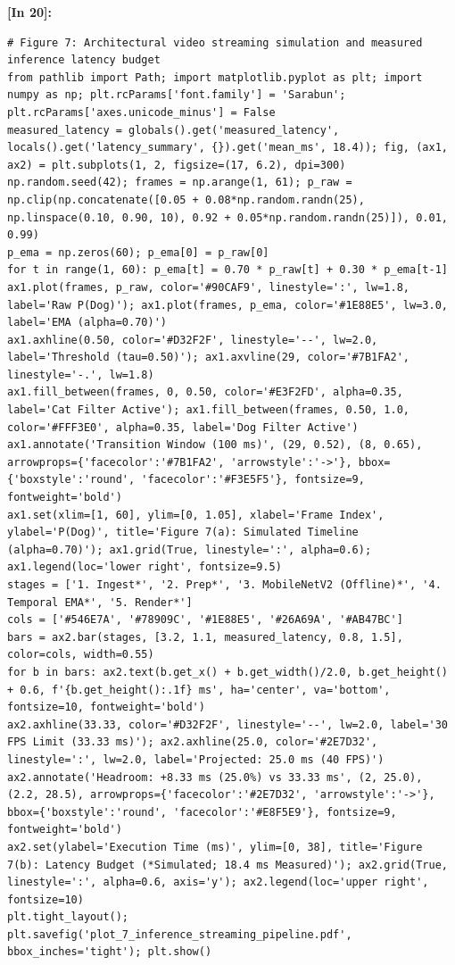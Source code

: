 \vspace{0.6em}
\noindent\textbf{\small [In 20]:}
\begin{lstlisting}[style=pycode]
# Figure 7: Architectural video streaming simulation and measured inference latency budget
from pathlib import Path; import matplotlib.pyplot as plt; import numpy as np; plt.rcParams['font.family'] = 'Sarabun'; plt.rcParams['axes.unicode_minus'] = False
measured_latency = globals().get('measured_latency', locals().get('latency_summary', {}).get('mean_ms', 18.4)); fig, (ax1, ax2) = plt.subplots(1, 2, figsize=(17, 6.2), dpi=300)
np.random.seed(42); frames = np.arange(1, 61); p_raw = np.clip(np.concatenate([0.05 + 0.08*np.random.randn(25), np.linspace(0.10, 0.90, 10), 0.92 + 0.05*np.random.randn(25)]), 0.01, 0.99)
p_ema = np.zeros(60); p_ema[0] = p_raw[0]
for t in range(1, 60): p_ema[t] = 0.70 * p_raw[t] + 0.30 * p_ema[t-1]
ax1.plot(frames, p_raw, color='#90CAF9', linestyle=':', lw=1.8, label='Raw P(Dog)'); ax1.plot(frames, p_ema, color='#1E88E5', lw=3.0, label='EMA (alpha=0.70)')
ax1.axhline(0.50, color='#D32F2F', linestyle='--', lw=2.0, label='Threshold (tau=0.50)'); ax1.axvline(29, color='#7B1FA2', linestyle='-.', lw=1.8)
ax1.fill_between(frames, 0, 0.50, color='#E3F2FD', alpha=0.35, label='Cat Filter Active'); ax1.fill_between(frames, 0.50, 1.0, color='#FFF3E0', alpha=0.35, label='Dog Filter Active')
ax1.annotate('Transition Window (100 ms)', (29, 0.52), (8, 0.65), arrowprops={'facecolor':'#7B1FA2', 'arrowstyle':'->'}, bbox={'boxstyle':'round', 'facecolor':'#F3E5F5'}, fontsize=9, fontweight='bold')
ax1.set(xlim=[1, 60], ylim=[0, 1.05], xlabel='Frame Index', ylabel='P(Dog)', title='Figure 7(a): Simulated Timeline (alpha=0.70)'); ax1.grid(True, linestyle=':', alpha=0.6); ax1.legend(loc='lower right', fontsize=9.5)
stages = ['1. Ingest*', '2. Prep*', '3. MobileNetV2 (Offline)*', '4. Temporal EMA*', '5. Render*']
cols = ['#546E7A', '#78909C', '#1E88E5', '#26A69A', '#AB47BC']
bars = ax2.bar(stages, [3.2, 1.1, measured_latency, 0.8, 1.5], color=cols, width=0.55)
for b in bars: ax2.text(b.get_x() + b.get_width()/2.0, b.get_height() + 0.6, f'{b.get_height():.1f} ms', ha='center', va='bottom', fontsize=10, fontweight='bold')
ax2.axhline(33.33, color='#D32F2F', linestyle='--', lw=2.0, label='30 FPS Limit (33.33 ms)'); ax2.axhline(25.0, color='#2E7D32', linestyle=':', lw=2.0, label='Projected: 25.0 ms (40 FPS)')
ax2.annotate('Headroom: +8.33 ms (25.0%) vs 33.33 ms', (2, 25.0), (2.2, 28.5), arrowprops={'facecolor':'#2E7D32', 'arrowstyle':'->'}, bbox={'boxstyle':'round', 'facecolor':'#E8F5E9'}, fontsize=9, fontweight='bold')
ax2.set(ylabel='Execution Time (ms)', ylim=[0, 38], title='Figure 7(b): Latency Budget (*Simulated; 18.4 ms Measured)'); ax2.grid(True, linestyle=':', alpha=0.6, axis='y'); ax2.legend(loc='upper right', fontsize=10)
plt.tight_layout(); plt.savefig('plot_7_inference_streaming_pipeline.pdf', bbox_inches='tight'); plt.show()\end{lstlisting}
